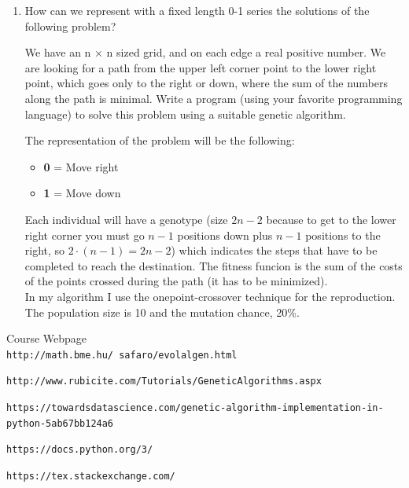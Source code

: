 \documentclass[12pt,english]{article}
\begin{document}
\begin{enumerate}
\item How can we represent with a fixed length 0-1 series the solutions of the following problem?

We have an n × n sized grid, and on each edge a real positive number.
We are looking for a path from the upper left corner point to the lower
right point, which goes only to the right or down, where the sum of the numbers along the path is minimal. Write a program (using your favorite programming language) to solve this problem using a suitable genetic algorithm.

The representation of the problem will be the following:
\begin{itemize}
	\item \textbf{0} = Move right
	\item \textbf{1} = Move down
\end{itemize}
Each individual will have a genotype (size $2n - 2$ because to get to the lower right corner you must go $n-1$ positions down plus $n-1$ positions to the right, so $2\cdot(n-1)=2n-2$) which indicates the steps that have to be completed to reach the destination. The fitness funcion is the sum of the costs of the points crossed during the path (it has to be minimized).\\

In my algorithm I use the onepoint-crossover technique for the reproduction. The population size is 10 and the mutation chance, 20\%.

\end{enumerate}


\begin{thebibliography}{9}

Course Webpage
\\\texttt{http://math.bme.hu/~safaro/evolalgen.html}

\texttt{http://www.rubicite.com/Tutorials/GeneticAlgorithms.aspx}

\texttt{https://towardsdatascience.com/genetic-algorithm-implementation-in-python-5ab67bb124a6}

\texttt{https://docs.python.org/3/}


\texttt{https://tex.stackexchange.com/}




\end{thebibliography}
\end{document}
